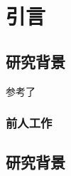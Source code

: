 \chapter{引言}

\section{研究背景}
参考了 \cite{曾谨言2013量子力学} \cite{feynman2011feynman} \cite{zurek2014quantum}
\cite{wikimedia:stern-gerlach-experiment, zettili2003quantum}
\subsection{前人工作}

\section{研究背景}
